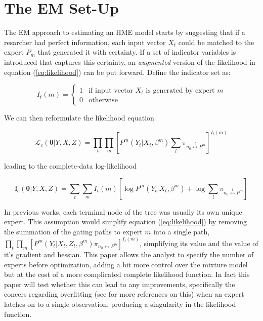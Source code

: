 \documentclass[12pt]{article}
\begin{document}
\section{The EM Set-Up}
The EM approach to estimating an HME model starts by suggesting that if a
resarcher had perfect information, each input vector $X_{t}$ could be matched
to the expert $P_{m}$ that generated it with certainty. If a set of indicator
variables is introduced that captures this certainty, an \textit{augmented}
version of the likelihood in equation (\ref{eq:likelihood}) can be put forward.
Define the indicator set as:

\begin{equation} \label{eq:indicator}
  I_{t}(m) = \begin{cases} 
     1 & \textrm{if input vector $X_{t}$ is generated by expert $m$} \\
     0 & \textrm{otherwise}
             \end{cases}
\end{equation}

We can then reformulate the likelihood equation

\begin{equation}  \label{eq:likelihood}
  \mathcal{L}_{c}(\boldsymbol{\theta}|Y, X, Z) = \prod_{t}\prod_{m}[P^{m}(Y_{t}|X_{t},\beta^{m})\sum_{l}\pi_{n_{0}\overset{l}{\longleftrightarrow} P^{m}}]^{I_{t}(m)}
\end{equation}

leading to the complete-data log-likelihood

\begin{equation}  \label{eq:loglikelihood}
  \boldsymbol{l}_{c}(\boldsymbol{\theta}|Y, X, Z) = \sum_{t}\sum_{m}I_{t}(m)[\log P^{m}(Y_{t}|X_{t},\beta^{m}) + \log\sum_{l}\pi_{n_{0}\overset{l}{\longleftrightarrow} P^{m}}]
\end{equation}

In previous works, each terminal node of the tree was usually its own unique
expert. This assumption would simplify equation (\ref{eq:likelihood})
by removing the summation of the gating paths to expert $m$ into a 
single path,
$\prod_{t}\prod_{m}[P^{m}(Y_{t}|X_{t}, Z_{t}, \beta^{m}) \pi_{n_{0} \longleftrightarrow P^{m}}]^{I_{t}(m)}$,
simplifying its value and the value of it's gradient and hessian. This paper
allows the analyst to specify the number of experts before optimization,
adding a bit more control over the mixture model but at the cost of a more
complicated complete likelihood function. In fact this paper will test whether
this can lead to any improvements, specifically the concers regarding overfitting
(see \cite{BishopSvenson2003} for more references on this) when an expert latches
on to a single observation, producing a singularity in the likelihood function.
\end{document}

